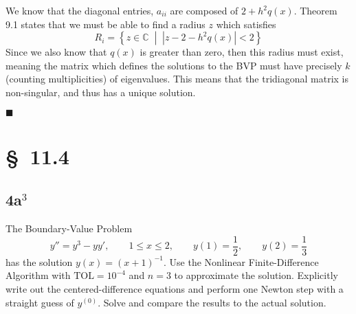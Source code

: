 \documentclass[12pt]{article}
\begin{document}
We know that the diagonal entries, $a_{ii}$ are composed of
$2+h^2q(x)$. Theorem 9.1 states that we must be able to find a radius
$z$ which satisfies
$$ R_i = \left\{ z \in \mathbb{C} \;\middle|\; |z-2-h^2q(x)| < 2\right\} $$
Since we also know that $q(x)$ is greater than zero, then this radius
must exist, meaning the matrix which defines the solutions to the BVP
must have precisely $k$ (counting multiplicities) of eigenvalues.
This means that the tridiagonal matrix is non-singular, and thus has a
unique solution.

\hfill$ \blacksquare $

\section{\S~11.4}
\subsection{4a$^3$}
The Boundary-Value Problem
$$ y'' = y^3-yy',\qquad 1\leq x\leq2,\qquad y(1)=\frac{1}{2},\qquad y(2)=\frac{1}{3} $$
has the solution $y(x)=(x+1)^{-1}$. Use the Nonlinear
Finite-Difference Algorithm with $\text{TOL}=10^{-4}$ and $n=3$ to
approximate the solution. Explicitly write out the centered-difference
equations and perform one Newton step with a straight guess of
$y^{(0)}$. Solve and compare the results to the actual solution.
\end{document}
